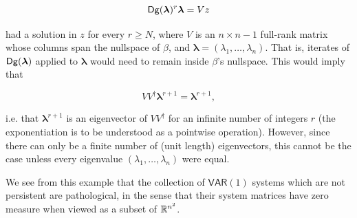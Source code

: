 \documentclass[12pt]{article}
\def\VAR{\mathsf{VAR}}  %
\begin{document}
\begin{example}
  \begin{equation*}
    \mathsf{Dg }(\bm{\lambda})^r \bm{\lambda} = Vz
  \end{equation*}

  had a solution in $z$ for every $r \ge N$, where $V$ is an
  $n \times n - 1$ full-rank matrix whose columns span the nullspace of $\beta$,
  and $\bm{\lambda} = (\lambda_1, \ldots, \lambda_n)$. That is,
  iterates of $\mathsf{Dg }(\bm{\lambda})$ applied to $\bm{\lambda}$ would need to remain
  inside $\beta$'s nullspace.  This would imply that

  \begin{equation*}
    VV^\dagger \bm{\lambda}^{r + 1} = \bm{\lambda}^{r + 1},
  \end{equation*}

  i.e. that $\bm{\lambda}^{r + 1}$ is an eigenvector of $VV^\dagger$
  for an infinite number of integers $r$ (the exponentiation is to be
  understood as a pointwise operation).  However, since there can only
  be a finite number of (unit length) eigenvectors, this cannot be the
  case unless every eigenvalue $(\lambda_1, \ldots, \lambda_n)$ were
  equal.

  We see from this example that the collection of $\VAR(1)$ systems
  which are not persistent are pathological, in the sense that their
  system matrices have zero measure when viewed as a subset of $\mathbb{R}^{n^2}$.
\end{example}
\end{document}
